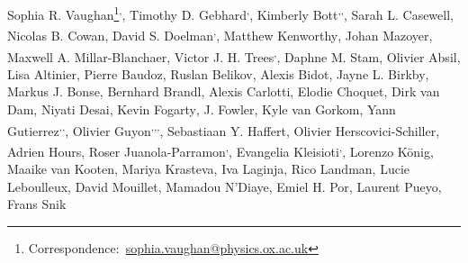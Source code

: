 Sophia R. Vaughan\thanks{Correspondence:~\url{sophia.vaughan@physics.ox.ac.uk}}\textsuperscript{,},
Timothy D. Gebhard\textsuperscript{,},
Kimberly Bott\textsuperscript{,,},
Sarah L. Casewell\textsuperscript{},
\newauthor
Nicolas B. Cowan\textsuperscript{},
David S. Doelman\textsuperscript{,},
Matthew Kenworthy\textsuperscript{},
Johan Mazoyer\textsuperscript{},
\newauthor
Maxwell A. Millar-Blanchaer\textsuperscript{},
Victor J. H. Trees\textsuperscript{,},
Daphne M. Stam\textsuperscript{},
Olivier Absil\textsuperscript{},
\newauthor
Lisa Altinier\textsuperscript{},
Pierre Baudoz\textsuperscript{},
Ruslan Belikov\textsuperscript{},
Alexis Bidot\textsuperscript{},
Jayne L. Birkby\textsuperscript{},
\newauthor
Markus J. Bonse\textsuperscript{},
Bernhard Brandl\textsuperscript{},
Alexis Carlotti\textsuperscript{},
Elodie Choquet\textsuperscript{},
Dirk van Dam\textsuperscript{},
\newauthor
Niyati Desai\textsuperscript{},
Kevin Fogarty\textsuperscript{},
J. Fowler\textsuperscript{},
Kyle van Gorkom\textsuperscript{},
Yann Gutierrez\textsuperscript{,,},
\newauthor
Olivier Guyon\textsuperscript{,,,},
Sebastiaan Y. Haffert\textsuperscript{},
Olivier Herscovici-Schiller\textsuperscript{},
Adrien Hours\textsuperscript{},
\newauthor
Roser Juanola-Parramon\textsuperscript{,},
Evangelia Kleisioti\textsuperscript{,},
Lorenzo König\textsuperscript{},
Maaike van Kooten\textsuperscript{},
\newauthor
Mariya Krasteva\textsuperscript{},
Iva Laginja\textsuperscript{},
Rico Landman\textsuperscript{},
Lucie Leboulleux\textsuperscript{},
David Mouillet\textsuperscript{},
\newauthor
Mamadou N’Diaye\textsuperscript{},
Emiel H. Por\textsuperscript{},
Laurent Pueyo\textsuperscript{},
Frans Snik\textsuperscript{}
